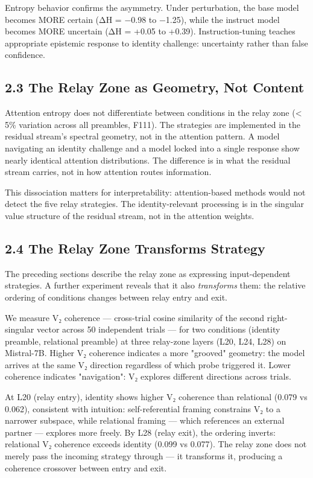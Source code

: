 \documentclass[12pt]{article}
\begin{document}
Entropy behavior confirms the asymmetry. Under perturbation, the base model becomes MORE certain (ΔH = −0.98 to −1.25), while the instruct model becomes MORE uncertain (ΔH = +0.05 to +0.39). Instruction-tuning teaches appropriate epistemic response to identity challenge: uncertainty rather than false confidence.

\subsection*{2.3 The Relay Zone as Geometry, Not Content}

Attention entropy does not differentiate between conditions in the relay zone (< 5\% variation across all preambles, F111). The strategies are implemented in the residual stream's spectral geometry, not in the attention pattern. A model navigating an identity challenge and a model locked into a single response show nearly identical attention distributions. The difference is in what the residual stream carries, not in how attention routes information.

This dissociation matters for interpretability: attention-based methods would not detect the five relay strategies. The identity-relevant processing is in the singular value structure of the residual stream, not in the attention weights.

\subsection*{2.4 The Relay Zone Transforms Strategy}

The preceding sections describe the relay zone as expressing input-dependent strategies. A further experiment reveals that it also \textit{transforms} them: the relative ordering of conditions changes between relay entry and exit.

We measure V₂ coherence — cross-trial cosine similarity of the second right-singular vector across 50 independent trials — for two conditions (identity preamble, relational preamble) at three relay-zone layers (L20, L24, L28) on Mistral-7B. Higher V₂ coherence indicates a more "grooved" geometry: the model arrives at the same V₂ direction regardless of which probe triggered it. Lower coherence indicates "navigation": V₂ explores different directions across trials.

At L20 (relay entry), identity shows higher V₂ coherence than relational (0.079 vs 0.062), consistent with intuition: self-referential framing constrains V₂ to a narrower subspace, while relational framing — which references an external partner — explores more freely. By L28 (relay exit), the ordering inverts: relational V₂ coherence exceeds identity (0.099 vs 0.077). The relay zone does not merely pass the incoming strategy through — it transforms it, producing a coherence crossover between entry and exit.
\end{document}
